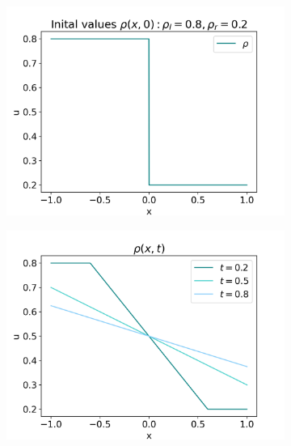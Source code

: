 \documentclass[10pt]{article}
\numberwithin{equation}{section}
\begin{document}
\begin{figure} \centering
    
\end{figure}

\begin{figure}
     \centering
     \begin{subfigure}[b]{0.3\textwidth}
         \centering
         \includegraphics[width=\textwidth]{Figures/Model/Plots/RarefacIV.png}
     \end{subfigure}
     \hfill
     \begin{subfigure}[b]{0.3\textwidth}
         \centering
         \includegraphics[width=\textwidth]{Figures/Model/Plots/RarefacAtTime.png}

\end{subfigure}
\end{figure}
\end{document}
